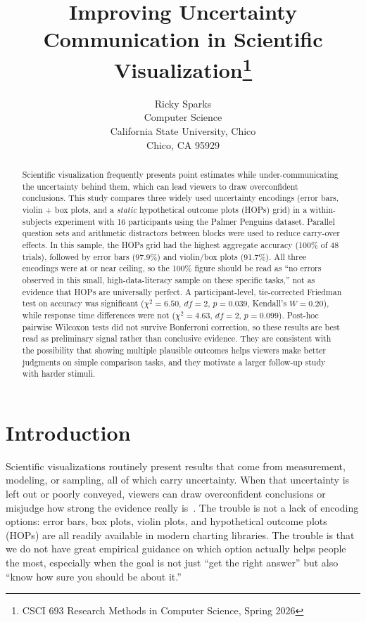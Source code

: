 \documentclass{article}
\title{Improving Uncertainty Communication in Scientific
Visualization\footnote{CSCI 693 Research Methods in Computer Science,
Spring 2026}}
\author{
  Ricky Sparks\\
  Computer Science\\
  California State University, Chico\\
  Chico, CA 95929\\
  \email{rsparks2@csuchico.edu}
}
\begin{document}
\maketitle

\begin{abstract}
Scientific visualization frequently presents point estimates while
under-communicating the uncertainty behind them, which can lead viewers
to draw overconfident conclusions.  This study compares three widely
used uncertainty encodings (error bars, violin + box plots, and a
\emph{static} hypothetical outcome plots (HOPs) grid) in a
within-subjects experiment with 16 participants using the Palmer
Penguins dataset.  Parallel question sets and arithmetic distractors
between blocks were used to reduce carry-over effects.  In this
sample, the HOPs grid had the highest aggregate accuracy
(100\% of 48 trials), followed by error bars (97.9\%) and violin/box
plots (91.7\%).  All three encodings were at or near ceiling, so the
100\% figure should be read as ``no errors observed in this small,
high-data-literacy sample on these specific tasks,'' not as evidence
that HOPs are universally perfect.  A participant-level, tie-corrected
Friedman test on accuracy was significant ($\chi^2 = 6.50$, $df = 2$,
$p = 0.039$, Kendall's $W = 0.20$), while response time differences
were not ($\chi^2 = 4.63$, $df = 2$, $p = 0.099$).  Post-hoc pairwise
Wilcoxon tests did not survive Bonferroni correction, so these results
are best read as preliminary signal rather than conclusive evidence.  They are
consistent with the possibility that showing multiple plausible
outcomes helps viewers make better judgments on simple comparison
tasks, and they motivate a larger follow-up study with harder stimuli.
\end{abstract}

\section{Introduction}

Scientific visualizations routinely present results that come from
measurement, modeling, or sampling, all of which carry uncertainty.
When that uncertainty is left out or poorly conveyed, viewers can draw
overconfident conclusions or misjudge how strong the evidence really
is~\cite{mehta2022}.  The trouble is not a lack of encoding options:
error bars, box plots, violin plots, and hypothetical outcome plots
(HOPs) are all readily available in modern charting libraries.  The
trouble is that we do not have great empirical guidance on which option
actually helps people the most, especially when the goal is not just
``get the right answer'' but also ``know how sure you should be about
it.''
\end{document}
